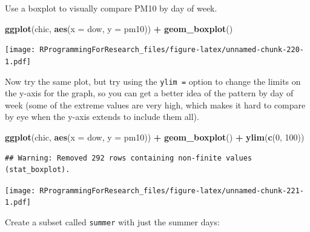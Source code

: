 \documentclass[]{book}
\makeatletter
\newenvironment{Shaded}{\begin{snugshade}}{\end{snugshade}}
\newcommand{\KeywordTok}[1]{\textcolor[rgb]{0.13,0.29,0.53}{\textbf{#1}}}
\newcommand{\DataTypeTok}[1]{\textcolor[rgb]{0.13,0.29,0.53}{#1}}
\newcommand{\DecValTok}[1]{\textcolor[rgb]{0.00,0.00,0.81}{#1}}
\newcommand{\StringTok}[1]{\textcolor[rgb]{0.31,0.60,0.02}{#1}}
\newcommand{\OperatorTok}[1]{\textcolor[rgb]{0.81,0.36,0.00}{\textbf{#1}}}
\newcommand{\NormalTok}[1]{#1}
\newenvironment{kframe}{%
\medskip{}
\setlength{\fboxsep}{.8em}
 \def\at@end@of@kframe{}%
 \ifinner\ifhmode%
  \def\at@end@of@kframe{\end{minipage}}%
  \begin{minipage}{\columnwidth}%
 \fi\fi%
 \def\FrameCommand##1{\hskip\@totalleftmargin \hskip-\fboxsep
 \colorbox{shadecolor}{##1}\hskip-\fboxsep
     \hskip-\linewidth \hskip-\@totalleftmargin \hskip\columnwidth}%
 \MakeFramed {\advance\hsize-\width
   \@totalleftmargin\z@ \linewidth\hsize
   \@setminipage}}%
 {\par\unskip\endMakeFramed%
 \at@end@of@kframe}
\renewenvironment{Shaded}{\begin{kframe}}{\end{kframe}}
\theoremstyle{definition}
\theoremstyle{definition}
\theoremstyle{definition}
\theoremstyle{remark}
\makeatother
\begin{document}
Use a boxplot to visually compare PM10 by day of week.

\begin{Shaded}
\begin{Highlighting}[]
\KeywordTok{ggplot}\NormalTok{(chic, }\KeywordTok{aes}\NormalTok{(}\DataTypeTok{x =}\NormalTok{ dow, }\DataTypeTok{y =}\NormalTok{ pm10)) }\OperatorTok{+}\StringTok{ }
\StringTok{  }\KeywordTok{geom_boxplot}\NormalTok{()}
\end{Highlighting}
\end{Shaded}

\texttt{[image: RProgrammingForResearch\_files/figure-latex/unnamed-chunk-220-1.pdf]}

Now try the same plot, but try using the \texttt{ylim\ =} option to
change the limits on the y-axis for the graph, so you can get a better
idea of the pattern by day of week (some of the extreme values are very
high, which makes it hard to compare by eye when the y-axis extends to
include them all).

\begin{Shaded}
\begin{Highlighting}[]
\KeywordTok{ggplot}\NormalTok{(chic, }\KeywordTok{aes}\NormalTok{(}\DataTypeTok{x =}\NormalTok{ dow, }\DataTypeTok{y =}\NormalTok{ pm10)) }\OperatorTok{+}\StringTok{ }
\StringTok{  }\KeywordTok{geom_boxplot}\NormalTok{() }\OperatorTok{+}\StringTok{ }
\StringTok{  }\KeywordTok{ylim}\NormalTok{(}\KeywordTok{c}\NormalTok{(}\DecValTok{0}\NormalTok{, }\DecValTok{100}\NormalTok{))}
\end{Highlighting}
\end{Shaded}

\begin{verbatim}
## Warning: Removed 292 rows containing non-finite values (stat_boxplot).
\end{verbatim}

\texttt{[image: RProgrammingForResearch\_files/figure-latex/unnamed-chunk-221-1.pdf]}

Create a subset called \texttt{summer} with just the summer days:

\begin{Shaded}
\end{Shaded}
\end{document}
